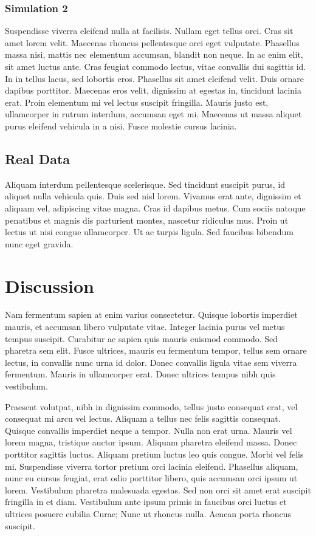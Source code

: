 \documentclass[draft,jgrga]{AGUTeX}
\begin{document}
\begin{article}
\subsubsection{Simulation 2}

Suspendisse viverra eleifend nulla at facilisis. Nullam eget tellus orci. Cras sit amet lorem velit. Maecenas rhoncus pellentesque orci eget vulputate. Phasellus massa nisi, mattis nec elementum accumsan, blandit non neque. In ac enim elit, sit amet luctus ante. Cras feugiat commodo lectus, vitae convallis dui sagittis id. In in tellus lacus, sed lobortis eros. Phasellus sit amet eleifend velit. Duis ornare dapibus porttitor. Maecenas eros velit, dignissim at egestas in, tincidunt lacinia erat. Proin elementum mi vel lectus suscipit fringilla. Mauris justo est, ullamcorper in rutrum interdum, accumsan eget mi. Maecenas ut massa aliquet purus eleifend vehicula in a nisi. Fusce molestie cursus lacinia.

\subsection{Real Data}

Aliquam interdum pellentesque scelerisque. Sed tincidunt suscipit purus, id aliquet nulla vehicula quis. Duis sed nisl lorem. Vivamus erat ante, dignissim et aliquam vel, adipiscing vitae magna. Cras id dapibus metus. Cum sociis natoque penatibus et magnis dis parturient montes, nascetur ridiculus mus. Proin ut lectus ut nisi congue ullamcorper. Ut ac turpis ligula. Sed faucibus bibendum nunc eget gravida.


\section{Discussion}

Nam fermentum sapien at enim varius consectetur. Quisque lobortis imperdiet mauris, et accumsan libero vulputate vitae. Integer lacinia purus vel metus tempus suscipit. Curabitur ac sapien quis mauris euismod commodo. Sed pharetra sem elit. Fusce ultrices, mauris eu fermentum tempor, tellus sem ornare lectus, in convallis nunc urna id dolor. Donec convallis ligula vitae sem viverra fermentum. Mauris in ullamcorper erat. Donec ultrices tempus nibh quis vestibulum.

Praesent volutpat, nibh in dignissim commodo, tellus justo consequat erat, vel consequat mi arcu vel lectus. Aliquam a tellus nec felis sagittis consequat. Quisque convallis imperdiet neque a tempor. Nulla non erat urna. Mauris vel lorem magna, tristique auctor ipsum. Aliquam pharetra eleifend massa. Donec porttitor sagittis luctus. Aliquam pretium luctus leo quis congue. Morbi vel felis mi. Suspendisse viverra tortor pretium orci lacinia eleifend. Phasellus aliquam, nunc eu cursus feugiat, erat odio porttitor libero, quis accumsan orci ipsum ut lorem. Vestibulum pharetra malesuada egestas. Sed non orci sit amet erat suscipit fringilla in et diam. Vestibulum ante ipsum primis in faucibus orci luctus et ultrices posuere cubilia Curae; Nunc ut rhoncus nulla. Aenean porta rhoncus suscipit.


\end{article}
\end{document}
